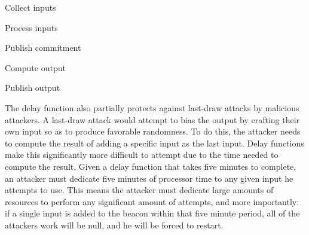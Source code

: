 \begin{enumberate}
    \item Collect inputs
    \item Process inputs
    \item Publish commitment
    \item Compute output
    \item Publish output
\end{enumberate}

The delay function also partially protects against last-draw attacks by malicious attackers. A last-draw attack would attempt to bias the output by crafting their own input so as to produce favorable randomness. To do this, the attacker needs to compute the result of adding a specific input as the last input. Delay functions make this significantly more difficult to attempt due to the time needed to compute the result. Given a delay function that takes five minutes to complete, an attacker must dedicate five minutes of processor time to any given input he attempts to use. This means the attacker must dedicate large amounts of resources to perform any significant amount of attempts, and more importantly: if a single input is added to the beacon within that five minute period, all of the attackers work will be null, and he will be forced to restart.

